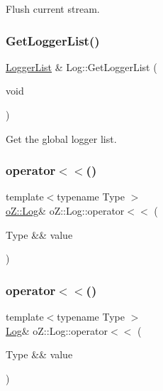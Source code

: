 Flush current stream. 

\mbox{\label{classo_z_1_1_log_aa1c737e66220f5f6f2f557c054b44e48}} 
\subsubsection{\texorpdfstring{GetLoggerList()}{GetLoggerList()}}
{\footnotesize\ttfamily \mbox{\hyperlink{namespaceo_z_a2d18a70272709242e8e7ebffc3f1806c}{Logger\+List}} \& Log\+::\+Get\+Logger\+List (\begin{DoxyParamCaption}\item[{void}]{ }\end{DoxyParamCaption})\hspace{0.3cm}{\ttfamily [static]}}



Get the global logger list. 

\mbox{\label{classo_z_1_1_log_ab4b6199f686c0b32f40be8885fca9db0}} 
\subsubsection{\texorpdfstring{operator$<$$<$()}{operator<<()}\hspace{0.1cm}{\footnotesize\ttfamily [1/2]}}
{\footnotesize\ttfamily template$<$typename Type $>$ \\
\mbox{\hyperlink{classo_z_1_1_log}{o\+Z\+::\+Log}}\& o\+Z\+::\+Log\+::operator$<$$<$ (\begin{DoxyParamCaption}\item[{Type \&\&}]{value }\end{DoxyParamCaption})}

\mbox{\label{classo_z_1_1_log_a0cb4c3c614b1d5ae6285aecb31554fb4}} 
\subsubsection{\texorpdfstring{operator$<$$<$()}{operator<<()}\hspace{0.1cm}{\footnotesize\ttfamily [2/2]}}
{\footnotesize\ttfamily template$<$typename Type $>$ \\
\mbox{\hyperlink{classo_z_1_1_log}{Log}}\& o\+Z\+::\+Log\+::operator$<$$<$ (\begin{DoxyParamCaption}\item[{Type \&\&}]{value }\end{DoxyParamCaption})}



